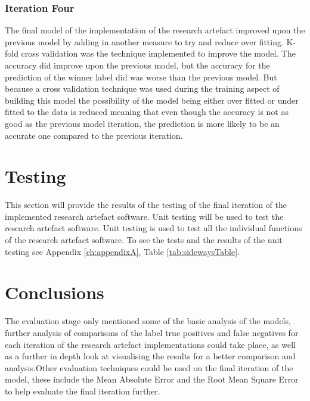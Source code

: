 \subsubsection{Iteration Four}
The final model of the implementation of the research artefact improved upon the previous model by adding in another measure to try and reduce over fitting. K-fold cross validation was the technique implemented to improve the model. The accuracy did improve upon the previous model, but the accuracy for the prediction of the winner label did was worse than the previous model. But because a cross validation technique was used during the training aspect of building this model the possibility of the model being either over fitted or under fitted to the data is reduced meaning that even though the accuracy is not as good as the previous model iteration, the prediction is more likely to be an accurate one compared to the previous iteration. 


\section{Testing}
This section will provide the results of the testing of the final iteration of the implemented research artefact software. Unit testing will be used to test the research artefact software. Unit testing is used to test all the individual functions of the research artefact software. To see the tests and the results of the unit testing see Appendix \ref{ch:appendixA}, Table \ref{tab:sidewaysTable}.
\section{Conclusions}
The evaluation stage only mentioned some of the basic analysis of the models, further analysis of comparisons of the label true positives and false negatives for each iteration of the research artefact implementations could take place, as well as a further in depth look at visualising the results for a better comparison and analysis.Other evaluation techniques could be used on the final iteration of the model, these include the Mean Absolute Error and the  Root Mean Square Error to help evaluate the final iteration further.